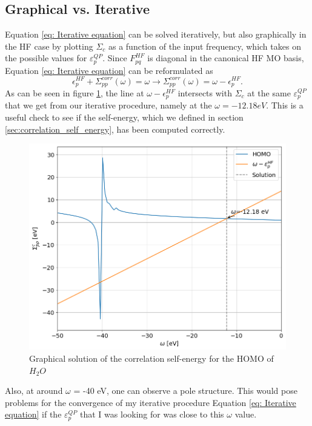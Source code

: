 \documentclass[12pt]{caltech_thesis}
\begin{document}
\subsection{Graphical vs. Iterative}
Equation \ref{eq: Iterative equation} can be solved iteratively, but also graphically in the HF case by plotting $\Sigma _{c}$ as a function of the input frequency, which takes on  the possible values for $\varepsilon_{p}^{QP}$. Since $F_{pq}^{HF}$ is diagonal in the canonical HF MO basis, Equation \ref{eq: Iterative equation} can be reformulated as
\begin{equation}
    \epsilon _{p}^{HF} + \Sigma_{pp}^{corr}(\omega) = \omega  \rightarrow \Sigma_{pp}^{corr}(\omega) = \omega  - \epsilon _{p}^{HF}.
\end{equation}
As can be seen in figure \ref{fig:graphic}, the line at $\omega - \epsilon_{p}^{HF}$ intersects with $\Sigma _{c}$ at the same $\varepsilon_{p}^{QP}$ that we get from our iterative procedure, namely at the $\omega = -12.18 eV$.
 This is a useful check to see if the self-energy, which we defined in section \ref{sec:correlation_self_energy}, has been computed correctly.
\begin{figure}[h]
    \centering
    \includegraphics[width=\textwidth]{correlation_energies.png}
\caption{Graphical solution of the correlation self-energy for the HOMO of $H_2O$}
\label{fig:graphic}
\end{figure}
Also, at around $\omega$ = -40 eV, one can observe a pole structure. This would pose problems for the convergence of my iterative procedure Equation \ref{eq: Iterative equation} if the $\varepsilon_{p}^{QP}$ that I was looking for was close to this $\omega $ value. 
\end{document}
